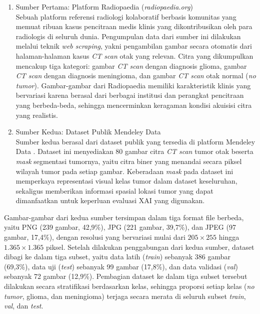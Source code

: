 \begin{enumerate}
	\item Sumber Pertama: Platform Radiopaedia (\textit{radiopaedia.org})\\
	Sebuah platform referensi radiologi kolaboratif berbasis komunitas yang memuat ribuan kasus pencitraan medis klinis yang dikontribusikan oleh para radiologis di seluruh dunia. Pengumpulan data dari sumber ini dilakukan melalui teknik \textit{web scraping}, yakni pengambilan gambar secara otomatis dari halaman-halaman kasus \textit{CT scan} otak yang relevan. Citra yang dikumpulkan mencakup tiga kategori: gambar \textit{CT scan} dengan diagnosis glioma, gambar \textit{CT scan} dengan diagnosis meningioma, dan gambar \textit{CT scan} otak normal (\textit{no tumor}). Gambar-gambar dari Radiopaedia memiliki karakteristik klinis yang bervariasi karena berasal dari berbagai institusi dan perangkat pencitraan yang berbeda-beda, sehingga mencerminkan keragaman kondisi akuisisi citra yang realistis.
	
	\item Sumber Kedua: Dataset Publik Mendeley Data\\
	Sumber kedua berasal dari dataset publik yang tersedia di platform Mendeley Data \cite{NamaPenulisTahun}. Dataset ini menyediakan 80 gambar citra \textit{CT scan} tumor otak beserta \textit{mask} segmentasi tumornya, yaitu citra biner yang menandai secara piksel wilayah tumor pada setiap gambar. Keberadaan \textit{mask} pada dataset ini memperkaya representasi visual kelas tumor dalam dataset keseluruhan, sekaligus memberikan informasi spasial lokasi tumor yang dapat dimanfaatkan untuk keperluan evaluasi XAI yang digunakan.
	
\end{enumerate}

Gambar-gambar dari kedua sumber tersimpan dalam tiga format file berbeda, yaitu PNG (239 gambar, 42,9\%), JPG (221 gambar, 39,7\%), dan JPEG (97 gambar, 17,4\%), dengan resolusi yang bervariasi mulai dari $205 \times 255$ hingga $1.365 \times 1.365$ piksel. Setelah dilakukan penggabungan dari kedua sumber, dataset dibagi ke dalam tiga subset, yaitu data latih (\textit{train}) sebanyak 386 gambar (69,3\%), data uji (\textit{test}) sebanyak 99 gambar (17,8\%), dan data validasi (\textit{val}) sebanyak 72 gambar (12,9\%). Pembagian dataset ke dalam tiga subset tersebut dilakukan secara stratifikasi berdasarkan kelas, sehingga proporsi setiap kelas (\textit{no tumor}, glioma, dan meningioma) terjaga secara merata di seluruh subset \textit{train}, \textit{val}, dan \textit{test}.

